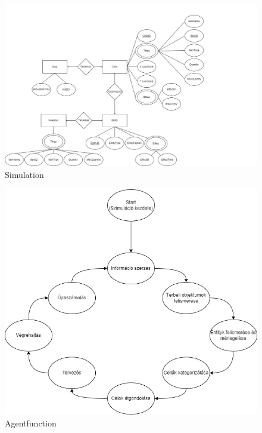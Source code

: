 \begin{figure}[!ht]
	\centering
	\includegraphics[scale=0.3]{images/simulationER.png}
	\caption{Simulation}
	\label{fig:simulation}
\end{figure}

\begin{figure}[!ht]
	\centering
	\includegraphics[scale=0.6]{images/agentfunction.png}
	\caption{Agentfunction}
	\label{fig:agentfunction}
\end{figure}

